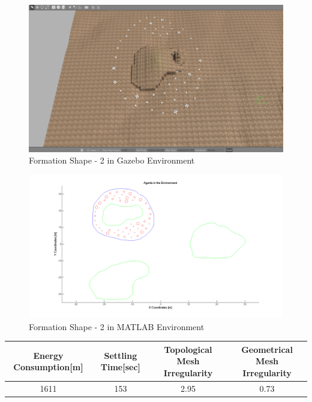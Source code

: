 \documentclass[twoside]{article}
\begin{document}
		
		
		 \begin{figure}[H]
		 	\caption{Formation Shape - 2 in Gazebo Environment}
		 	\centerline{\includegraphics[scale = 0.35]{2_Gazebo}}
		 \end{figure} 
		 
		 \begin{figure}[H]
		 	\caption{Formation Shape - 2 in MATLAB Environment}
		 	\centerline{\includegraphics[scale = 0.40]{2}}
		 \end{figure} 
		 
		 \begin{center}
		 	 \label{tab:title} 
		 	\begin{tabular}{||c| c |c |c ||}
		 		
		 		\hline
				 		\textbf{Energy Consumption[m]}  & \textbf{Settling Time[sec]} & \textbf{Topological Mesh Irregularity} & \textbf{Geometrical Mesh Irregularity}\\ 
		 		\hline
		 		1611 & 153 &  2.95& 0.73\\
		 		\hline
		 	\end{tabular}
		 \end{center}
		 
\end{document}
